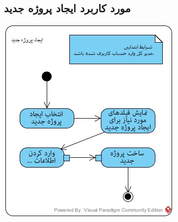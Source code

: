 \subsection*{مورد کاربرد ایجاد پروژه جدید}
\vspace{2cm}
\begin{center}
\includegraphics[width=\textwidth]{ActivityDiagrams/33.jpg}
\end{center}

\newpage
\vspace{1cm}
